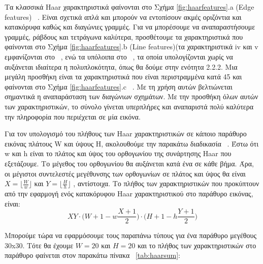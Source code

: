 Τα κλασσικά Haar χαρακτηριστικά φαίνονται στο Σχήμα \ref{fig:haarfeatures}.a (Edge features) ~\cite{OrePapSinOsu97}.
Είναι σχετικά απλά και μπορούν να εντοπίσουν ακμές οριζόντια και κατακόρυφα καθώς και διαγώνιες γραμμές. Για να
μπορέσουμε να αναπαραστήσουμε γραμμές, ράβδους και τετράγωνα καλύτερα, προσθέτουμε τα
χαρακτηριστικά που φαίνονται στο Σχήμα \ref{fig:haarfeatures}.b (Line features)(τα χαρακτηριστικά iv και v εμφανίζονται στο
~\cite{Viola01rapidobject}, ενώ τα υπόλοιπα στο ~\cite{Lienhart02anextended},
τα οποία υπολογίζονται χωρίς να αυξάνεται ιδιαίτερα η
πολυπλοκότητα, όπως θα δούμε στην ενότητα 2.2.2. Μια μεγάλη προσθήκη είναι τα χαρακτηριστικά
που είναι περιστραμμένα κατά 45 \degree και φαίνονται στο Σχήμα \ref{fig:haarfeatures}.c ~\cite{Lienhart02anextended}. Με τη χρήση αυτών
βελτιώνεται σημαντικά η αναπαράσταση των διαγώνιων σχημάτων. Με την προσθήκη όλων αυτών
των χαρακτηριστικών, το σύνολο γίνεται υπερπλήρες και αναπαριστά πολύ καλύτερα την
πληροφορία που περιέχεται σε μία εικόνα.

Για τον υπολογισμό του πλήθους των Haar χαρακτηριστικών σε κάποιο παράθυρο εικόνας
πλάτους W και ύψους H, ακολουθούμε την παρακάτω διαδικασία ~\cite{Lienhart02anextended}. Έστω ότι w και h
είναι το πλάτος και ύψος του ορθογωνίου της συνάρτησης Haar που εξετάζουμε. Το μέγεθος του
ορθογωνίου θα αυξάνεται κατά ένα σε κάθε βήμα. Άρα, οι μέγιστοι συντελεστές μεγέθυνσης των
ορθογωνίων σε πλάτος και ύψος θα είναι $X = \lfloor \frac{W}{w} \rfloor $ και $Y = \lfloor \frac{H}{h} \rfloor$ , αντίστοιχα. Το πλήθος των
χαρακτηριστικών που προκύπτουν από την εφαρμογή ενός κατακόρυφου Haar χαρακτηριστικού
στο παράθυρο εικόνας, είναι:
$$
XY \cdot \Bigg(W+1-w \frac{X+1}{2} \Bigg) \cdot \Bigg(H+1-h \frac{Y+1}{2} \Bigg)
$$

Μπορούμε τώρα να εφαρμόσουμε τους παραπάνω τύπους για ένα παράθυρο μεγέθους 30x30.
Τότε θα έχουμε $W=20$ και $Η=20$ και το πλήθος των χαρακτηριστικών στο παράθυρο φαίνεται
στον παρακάτω πίνακα ~\ref{tab:haarsum}:


